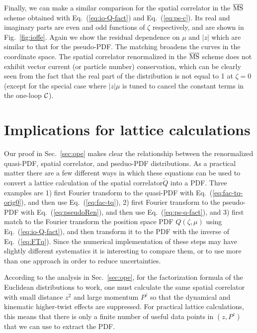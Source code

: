 \documentclass[prd,aps,twocolumn,preprintnumbers,showpacs,nofootinbib,superscriptaddress,notitlepage]{revtex4-1}
\newcommand{\spcorr}{spatial correlator\xspace}
\DeclareRobustCommand{\eq}[1]{Eq.~(\ref{eq:#1})}
\DeclareRobustCommand{\sec}[1]{Sec.~\ref{sec:#1}}
\begin{document}
Finally, we can make a similar comparison for the \spcorr in the $\overline{\rm MS}$ scheme obtained with Eq.~(\ref{eq:io-Q-fact}) and Eq.~(\ref{eq:ps-c}). Its real and imaginary parts are even and odd functions of $\zeta$ respectively, and are shown in Fig.~\ref{fig:ioffe}. Again we show the residual dependence on $\mu$ and $|z|$ which are similar to that for the pseudo-PDF.   The matching broadens the curves in the coordinate space.  The \spcorr renormalized in the $\overline{\rm MS}$ scheme does not exhibit vector current (or particle number) conservation, which can be clearly seen from the fact that the real part of the distribution is not equal to 1 at $\zeta=0$ (except for the special case where $|z|\mu$ is tuned to cancel the constant terms in the one-loop ${\cal C}$).



\section{Implications for lattice calculations}
\label{sec:lattice}

Our proof in \sec{ope} makes clear the relationship between the renormalized quasi-PDF, \spcorr, and pseduo-PDF distributions.  As a practical matter there are a few different ways in which these equations can be used to convert a lattice calculation of the \spcorr $\tilde Q$ into a PDF. Three examples are 1) first Fourier transform to the quasi-PDF with \eq{fac-tq-orig0}, and then use \eq{fac-tq}, 2) first Fourier transform to the pseudo-PDF with \eq{pseudoRen}, and then use \eq{ps-q-fact}, and 3) first match to the Fourier transform the position space PDF $Q(\zeta,\mu)$ using \eq{io-Q-fact}, and then transform it to the PDF with the inverse of \eq{FTq}.  Since the numerical implementation of these steps may have slightly different systematics it is interesting to compare them, or to use more than one approach in order to reduce uncertainties.

According to the analysis in Sec.~\ref{sec:ope}, for the factorization formula of the Euclidean distributions to work, one must calculate the same \spcorr with small distance $z^2$ and large momentum $P^z$ so that the dynamical and kinematic higher-twist effects are suppressed. For practical lattice calculations, this means that there is only a finite number of useful data points in $(z, P^z)$ that we can use to extract the PDF.
\end{document}
